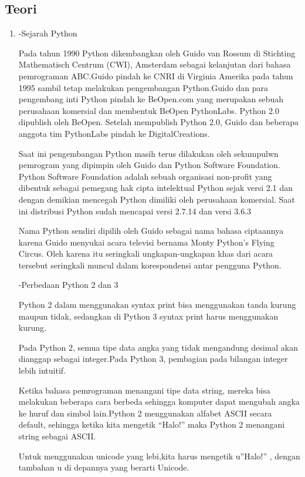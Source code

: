 \subsection{Teori}
\begin{enumerate}
    \item-Sejarah Python
    
    Pada tahun 1990 Python dikembangkan oleh Guido van Rossum  di Stichting Mathematisch Centrum (CWI), Amsterdam sebagai kelanjutan dari bahasa pemrograman ABC.Guido pindah ke CNRI di Virginia Amerika pada tahun 1995 sambil tetap melakukan pengembangan Python.Guido dan para pengembang inti Python pindah ke BeOpen.com yang merupakan sebuah perusahaan komersial dan membentuk BeOpen PythonLabs. Python 2.0 dipublish oleh BeOpen. Setelah mempublish Python 2.0, Guido dan beberapa anggota tim PythonLabs pindah ke DigitalCreations.

Saat ini pengembangan Python masih terus dilakukan oleh sekumpulwn pemrogram yang dipimpin oleh Guido dan Python Software Foundation. Python Software Foundation adalah sebuah organisasi non-profit yang dibentuk sebagai pemegang hak cipta intelektual Python sejak versi 2.1 dan dengan demikian mencegah Python dimiliki oleh perusahaan komersial. Saat ini distribusi Python sudah mencapai versi 2.7.14 dan versi 3.6.3

Nama Python sendiri dipilih oleh Guido sebagai nama bahasa ciptaannya karena Guido menyukai acara televisi bernama Monty Python's Flying Circus. Oleh karena itu seringkali ungkapan-ungkapan khas dari acara tersebut seringkali muncul dalam korespondensi antar pengguna Python.

-Perbedaan Python 2 dan 3 

Python 2 dalam menggunakan syntax print bisa menggunakan tanda kurung maupun tidak, sedangkan di Python 3 syntax print harus menggunakan kurung.

Pada Python 2, semua tipe data angka yang tidak mengandung desimal akan dianggap sebagai integer.Pada Python 3, pembagian pada bilangan integer lebih intuitif.

Ketika bahasa pemrograman menangani tipe data string, mereka bisa melakukan beberapa cara berbeda sehingga komputer dapat mengubah angka ke huruf dan simbol lain.Python 2 menggunakan alfabet ASCII secara default, sehingga ketika kita mengetik “Halo!”  maka Python 2 menangani string sebagai ASCII.

Untuk menggunakan unicode yang lebi,kita harus mengetik u”Halo!” , dengan tambahan u  di depannya yang berarti Unicode.


\end{enumerate}
